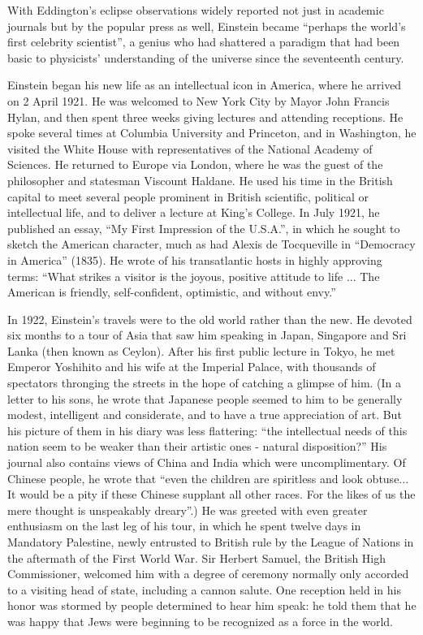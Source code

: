 \documentclass[twoside]{memoir}
\begin{document}
With Eddington's eclipse observations widely reported not just in academic journals but by the popular press as well, Einstein became \enquote{perhaps the world's first celebrity scientist}, a genius who had shattered a paradigm that had been basic to physicists' understanding of the universe since the seventeenth century.

Einstein began his new life as an intellectual icon in America, where he arrived on 2 April 1921.  He was welcomed to New York City by Mayor John Francis Hylan, and then spent three weeks giving lectures and attending receptions. He spoke several times at Columbia University and Princeton, and in Washington, he visited the White House with representatives of the National Academy of Sciences. He returned to Europe via London, where he was the guest of the philosopher and statesman Viscount Haldane.  He used his time in the British capital to meet several people prominent in British scientific, political or intellectual life, and to deliver a lecture at King's College. In July 1921, he published an essay, \enquote{My First Impression of the U.S.A.}, in which he sought to sketch the American character, much as had Alexis de Tocqueville  in \enquote{Democracy in America} (1835).\cite{7gwHd} He wrote of his transatlantic hosts in highly approving terms: \enquote{What strikes a visitor is the joyous, positive attitude to life ... The American is friendly, self-confident, optimistic, and without envy.}

In 1922, Einstein's travels were to the old world rather than the new. He devoted six months to a tour of Asia that saw him speaking in Japan, Singapore and Sri Lanka (then known as Ceylon). After his first public lecture in Tokyo, he met Emperor Yoshihito and his wife at the Imperial Palace, with thousands of spectators thronging the streets in the hope of catching a glimpse of him. (In a letter to his sons, he wrote that Japanese people seemed to him to be generally modest, intelligent and considerate, and to have a true appreciation of art. But his picture of them in his diary was less flattering: \enquote{the intellectual needs of this nation seem to be weaker than their artistic ones - natural disposition?} His journal also contains views of China and India which were uncomplimentary. Of Chinese people, he wrote that \enquote{even the children are spiritless and look obtuse... It would be a pity if these Chinese supplant all other races. For the likes of us the mere thought is unspeakably dreary}.\cite{38YkY}) He was greeted with even greater enthusiasm on the last leg of his tour, in which he spent twelve days in Mandatory Palestine,  newly entrusted to British rule by the League of Nations in the aftermath of the First World War. Sir Herbert Samuel, the British High Commissioner, welcomed him with a degree of ceremony normally only accorded to a visiting head of state, including a cannon salute. One reception held in his honor was stormed by people determined to hear him speak: he told them that he was happy that Jews were beginning to be recognized as a force in the world.
\end{document}
